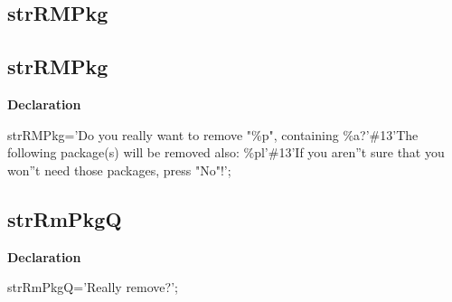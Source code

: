 \documentclass{report}
\newif\ifpdf
\begin{document}
\subsection*{\large{\textbf{strRMPkg}}\normalsize\hspace{1ex}\hrulefill}
\else
\subsection*{strRMPkg}
\fi
\label{trstrings-strRMPkg}
\begin{list}{}{
\setlength{\itemindent}{0cm}
\setlength{\listparindent}{0cm}
\setlength{\leftmargin}{\evensidemargin}
\addtolength{\leftmargin}{\tmplength}
\settowidth{\labelsep}{X}
\addtolength{\leftmargin}{\labelsep}
\setlength{\labelwidth}{\tmplength}
}
\item[\textbf{Declaration}\hfill]
\ifpdf
\begin{flushleft}
\fi
\begin{ttfamily}
strRMPkg='Do you really want to remove "{\%}p", containing {\%}a?'{\#}13'The following package(s) will be removed also: {\%}pl'{\#}13'If you aren''t sure that you won''t need those packages, press "No"!';\end{ttfamily}

\ifpdf
\end{flushleft}
\fi

\end{list}
\ifpdf
\subsection*{\large{\textbf{strRmPkgQ}}\normalsize\hspace{1ex}\hrulefill}
\else
\subsection*{strRmPkgQ}
\fi
\label{trstrings-strRmPkgQ}
\begin{list}{}{
\setlength{\itemindent}{0cm}
\setlength{\listparindent}{0cm}
\setlength{\leftmargin}{\evensidemargin}
\addtolength{\leftmargin}{\tmplength}
\settowidth{\labelsep}{X}
\addtolength{\leftmargin}{\labelsep}
\setlength{\labelwidth}{\tmplength}
}
\item[\textbf{Declaration}\hfill]
\ifpdf
\begin{flushleft}
\fi
\begin{ttfamily}
strRmPkgQ='Really remove?';\end{ttfamily}

\ifpdf
\end{flushleft}
\fi

\end{list}
\ifpdf
\end{document}
